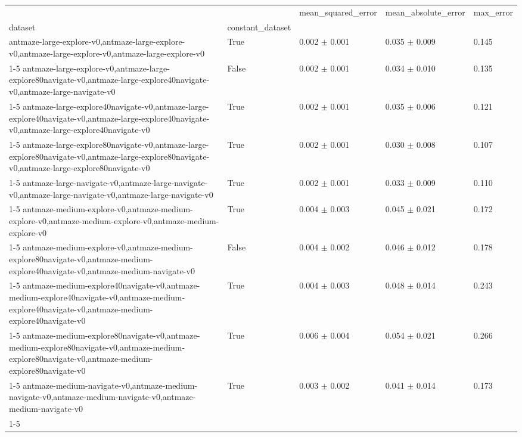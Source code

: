 \begin{tabular}{lllll}
\toprule
 &  & mean_squared_error & mean_absolute_error & max_error \\
dataset & constant_dataset &  &  &  \\
\midrule
antmaze-large-explore-v0,antmaze-large-explore-v0,antmaze-large-explore-v0,antmaze-large-explore-v0 & True & 0.002 $\pm$ 0.001 & 0.035 $\pm$ 0.009 & 0.145 \\
\cline{1-5}
antmaze-large-explore-v0,antmaze-large-explore80navigate-v0,antmaze-large-explore40navigate-v0,antmaze-large-navigate-v0 & False & 0.002 $\pm$ 0.001 & 0.034 $\pm$ 0.010 & 0.135 \\
\cline{1-5}
antmaze-large-explore40navigate-v0,antmaze-large-explore40navigate-v0,antmaze-large-explore40navigate-v0,antmaze-large-explore40navigate-v0 & True & 0.002 $\pm$ 0.001 & 0.035 $\pm$ 0.006 & 0.121 \\
\cline{1-5}
antmaze-large-explore80navigate-v0,antmaze-large-explore80navigate-v0,antmaze-large-explore80navigate-v0,antmaze-large-explore80navigate-v0 & True & 0.002 $\pm$ 0.001 & 0.030 $\pm$ 0.008 & 0.107 \\
\cline{1-5}
antmaze-large-navigate-v0,antmaze-large-navigate-v0,antmaze-large-navigate-v0,antmaze-large-navigate-v0 & True & 0.002 $\pm$ 0.001 & 0.033 $\pm$ 0.009 & 0.110 \\
\cline{1-5}
antmaze-medium-explore-v0,antmaze-medium-explore-v0,antmaze-medium-explore-v0,antmaze-medium-explore-v0 & True & 0.004 $\pm$ 0.003 & 0.045 $\pm$ 0.021 & 0.172 \\
\cline{1-5}
antmaze-medium-explore-v0,antmaze-medium-explore80navigate-v0,antmaze-medium-explore40navigate-v0,antmaze-medium-navigate-v0 & False & 0.004 $\pm$ 0.002 & 0.046 $\pm$ 0.012 & 0.178 \\
\cline{1-5}
antmaze-medium-explore40navigate-v0,antmaze-medium-explore40navigate-v0,antmaze-medium-explore40navigate-v0,antmaze-medium-explore40navigate-v0 & True & 0.004 $\pm$ 0.003 & 0.048 $\pm$ 0.014 & 0.243 \\
\cline{1-5}
antmaze-medium-explore80navigate-v0,antmaze-medium-explore80navigate-v0,antmaze-medium-explore80navigate-v0,antmaze-medium-explore80navigate-v0 & True & 0.006 $\pm$ 0.004 & 0.054 $\pm$ 0.021 & 0.266 \\
\cline{1-5}
antmaze-medium-navigate-v0,antmaze-medium-navigate-v0,antmaze-medium-navigate-v0,antmaze-medium-navigate-v0 & True & 0.003 $\pm$ 0.002 & 0.041 $\pm$ 0.014 & 0.173 \\
\cline{1-5}
\bottomrule
\end{tabular}
